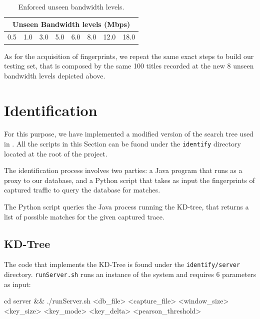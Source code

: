 \begin{table}[htb]
  \centering
  \begin{tabular}{|c|c|c|c|c|c|c|c|}
    \hline
    \multicolumn{8}{|c|}{\textbf{Unseen Bandwidth levels (Mbps)}} \\
    \hline
    0.5 & 1.0 & 3.0 & 5.0 & 6.0 & 8.0 & 12.0 & 18.0 \\
    \hline
  \end{tabular}
  \caption{Enforced unseen bandwidth levels.}
  \label{tab:unseen_bandwidths}
\end{table}

As for the acquisition of fingerprints, we repeat the same exact steps to build
our testing set, that is composed by the same 100 titles recorded at the new 8
unseen bandwidth levels depicted above. 

\newpage
\section{Identification}

For this purpose, we have implemented a modified version of the search tree
used in \cite{netflix-real-time}. All the scripts in this Section can be fuond
under the \texttt{identify} directory located at the root of the project.

The identification process involves two parties: a Java program that runs as
a proxy to our database, and a Python script that takes as input the
fingerprints of captured traffic to query the database for matches.

The Python script queries the Java process running the KD-tree, that returns a
list of possible matches for the given captured trace.


\subsection{KD-Tree}

The code that implements the KD-Tree is found under the \texttt{identify/server}
directory. \texttt{runServer.sh} runs an instance of the system and requires 6
parameters as input:

\begin{bash_script}[caption={Start the Java Server}, label={lst:java}]
        cd server && ./runServer.sh <db_file> <capture_file> <window_size> <key_size> <key_mode> <key_delta> <pearson_threshold>
\end{bash_script}

